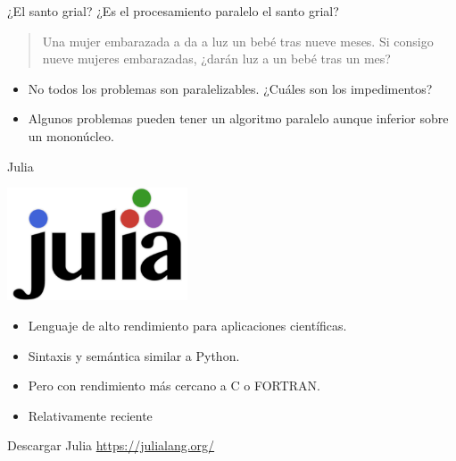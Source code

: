 \documentclass[bigger]{beamer}
\begin{document}
\begin{frame}[label={sec:org08fdc09}]{¿El santo grial?}
¿Es el procesamiento paralelo el santo grial?

\begin{quote}
Una mujer embarazada a da a luz un bebé tras nueve meses. Si consigo nueve mujeres embarazadas, ¿darán luz a un bebé tras un mes?
\end{quote}

\begin{itemize}
\item No todos los problemas son paralelizables. ¿Cuáles son los impedimentos?
\item Algunos problemas pueden tener un algoritmo paralelo aunque inferior sobre un mononúcleo.
\end{itemize}
\end{frame}

\begin{frame}[label={sec:org5dc07bc}]{Julia}
\begin{center}
\includegraphics[width=0.4\textwidth]{./julia.png}
\end{center}

\begin{itemize}
\item Lenguaje de alto rendimiento para aplicaciones científicas.
\item Sintaxis y semántica similar a Python.
\item Pero con rendimiento más cercano a C o FORTRAN.
\item Relativamente reciente
\end{itemize}
\end{frame}

\begin{frame}[label={sec:orgab3e975}]{Descargar Julia}
\url{https://julialang.org/}
\end{frame}
\end{document}
